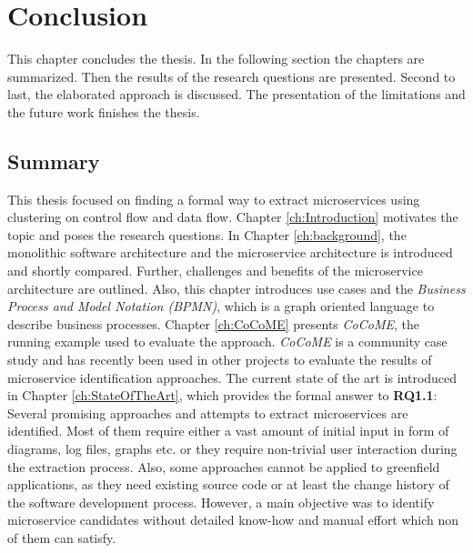 \chapter{Conclusion}
\label{ch:Conclusion}
This chapter concludes the thesis. In the following section the chapters are summarized. Then the results of the research questions are presented. Second to last, the elaborated approach is discussed. The presentation of the limitations and the future work finishes the thesis.


\section{Summary}
This thesis focused on finding a formal way to extract microservices using clustering on control flow and data flow. Chapter \ref{ch:Introduction} motivates the topic and poses the research questions. In Chapter \ref{ch:background}, the monolithic software architecture and the microservice architecture is introduced and shortly compared. Further, challenges and benefits of the microservice architecture are outlined. Also, this chapter introduces use cases and the \textit{Business Process and Model Notation (BPMN)}, which is a graph oriented language to describe business processes. Chapter \ref{ch:CoCoME} presents \textit{CoCoME}, the running example used to evaluate the approach. \textit{CoCoME} is a community case study and has recently been used in other projects to evaluate the results of microservice identification approaches. The current state of the art is introduced in Chapter \ref{ch:StateOfTheArt}, which provides the formal answer to \textbf{RQ1.1}: Several promising approaches and attempts to extract microservices are identified. Most of them require either a vast amount of initial input in form of diagrams, log files, graphs etc. or they require non-trivial user interaction during the extraction process. Also, some approaches cannot be applied to greenfield applications, as they need existing source code or at least the change history of the software development process. However, a main objective was to identify microservice candidates without detailed know-how and manual effort which non of them can satisfy. \\
